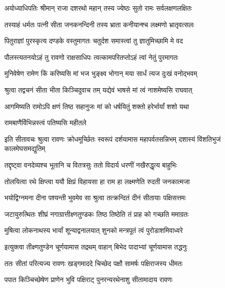 
\twolineshloka
{अयोध्याधिपतिः श्रीमान् राजा दशरथो महान्}
{तस्य ज्येष्ठः सुतो रामः सर्वलक्षणलक्षितः} %

\twolineshloka
{तस्याहं धर्मतः पत्नी सीता जनकनन्दिनी}
{तस्य भ्राता कनीयान्श्च लक्ष्मणो भ्रातृवत्सलः} %

\twolineshloka
{पितुराज्ञां पुरस्कृत्य दण्डके वस्तुमागतः}
{चतुर्दश समास्त्वां तु ज्ञातुमिच्छामि मे वद} %


\twolineshloka
{पौलस्त्यतनयोऽहं तु रावणो राक्षसाधिपः}
{त्वत्कामपरितप्तोऽहं त्वां नेतुं पुरमागतः} %

\twolineshloka
{मुनिवेषेण रामेण किं करिष्यसि मां भज}
{भुङ्क्ष्व भोगान् मया सार्धं त्यज दुःखं वनोद्भवम्} %

\twolineshloka
{श्रुत्वा तद्वचनं सीता भीता किञ्चिदुवाच तम्}
{यद्येवं भाषसे मां त्वं नाशमेष्यसि राघवात्} %

\twolineshloka
{आगमिष्यति रामोऽपि क्षणं तिष्ठ सहानुजः}
{मां को धर्षयितुं शक्तो हरेर्भार्यां शशो यथा} %

\onelineshloka
{रामबाणैर्विभिन्नस्त्वं पतिष्यसि महीतले} %


\threelineshloka
{इति सीतावचः श्रुत्वा रावणः क्रोधमूर्च्छितः}
{स्वरूपं दर्शयामास महापर्वतसन्निभम्}
{दशास्यं विंशतिभुजं कालमेघसमद्युतिम्} %

\twolineshloka
{तद्दृष्ट्वा वनदेव्यश्च भूतानि च वितत्रसुः}
{ततो विदार्य धरणीं नखैरुद्धृत्य बाहुभिः} %

\twolineshloka
{तोलयित्वा रथे क्षिप्त्वा ययौ क्षिप्रं विहायसा}
{हा राम हा लक्ष्मणेति रुदती जनकात्मजा} %

\twolineshloka
{भयोद्विग्नमना दीना पश्यन्ती भुवमेव सा}
{श्रुत्वा तत्क्रन्दितं दीनं सीतायाः पक्षिसत्तमः} %

\twolineshloka
{जटायुरुत्थितः शीघ्रं नगाग्रात्तीक्ष्णतुण्डकः}
{तिष्ठ तिष्ठेति तं प्राह को गच्छति ममाग्रतः} %

\twolineshloka
{मुषित्वा लोकनाथस्य भार्यां शून्याद्वनालयात्}
{शुनको मन्त्रपूतं त्वं पुरोडाशमिवाध्वरे} %

\twolineshloka
{इत्युक्त्वा तीक्ष्णतुण्डेन चूर्णयामास तद्रथम्}
{वाहान् बिभेद पादाभ्यां चूर्णयामास तद्धनुः} %

\twolineshloka
{ततः सीतां परित्यज्य रावणः खड्गमाददे}
{चिच्छेद पक्षौ सामर्षः पक्षिराजस्य धीमतः} %

\twolineshloka
{पपात किञ्चिच्छेषेण प्राणेन भुवि पक्षिराट्}
{पुनरन्यरथेनाशु सीतामादाय रावणः} %

